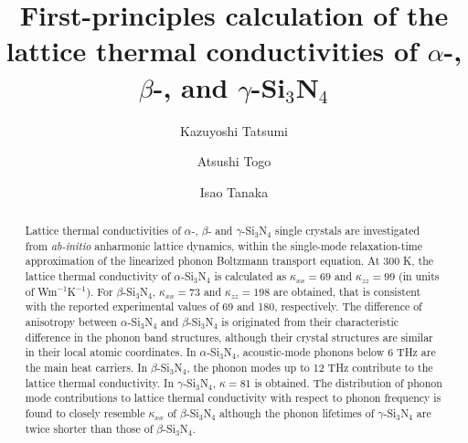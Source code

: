 \documentclass[twocolumn,amsmath,amssymb,a4paper,prb,superscriptaddress,floatfix]{revtex4-1}
\begin{document}
\title{First-principles calculation of the lattice thermal
conductivities of $\alpha$-, $\beta$-, and $\gamma$-Si$_3$N$_4$}

\author{Kazuyoshi Tatsumi} 

\author{Atsushi Togo}

\author{Isao Tanaka}

\begin{abstract}
Lattice thermal conductivities of $\alpha$-, $\beta$- and
$\gamma$-Si$_3$N$_4$ single crystals are investigated from {\it
ab-initio} anharmonic lattice dynamics, within the single-mode
relaxation-time approximation of the linearized phonon Boltzmann
transport equation. At 300 K, the lattice thermal conductivity of
$\alpha$-Si$_3$N$_4$ is calculated as $\kappa_{xx}=69$ and
$\kappa_{zz}=99$ (in units of Wm$^{-1}$K$^{-1}$). For
$\beta$-Si$_3$N$_4$, $\kappa_{xx}=73$ and $\kappa_{zz}=198$ are
obtained, that is consistent with the reported experimental values of 69
and 180, respectively. The difference of anisotropy between
$\alpha$-Si$_3$N$_4$ and $\beta$-Si$_3$N$_4$ is originated from their
characteristic difference in the phonon band structures, although their
crystal structures are similar in their local atomic coordinates. In
$\alpha$-Si$_3$N$_4$, acoustic-mode phonons below 6 THz are the main
heat carriers. In $\beta$-Si$_3$N$_4$, the phonon modes up to 12 THz
contribute to the lattice thermal conductivity.
%
In $\gamma$-Si$_3$N$_4$, $\kappa=81$ is obtained. The distribution of phonon
mode contributions to lattice thermal conductivity with respect to phonon
frequency is found to closely resemble $\kappa_{xx}$ of $\beta$-Si$_3$N$_4$
although the phonon lifetimes of $\gamma$-Si$_3$N$_4$ are twice shorter than
those of $\beta$-Si$_3$N$_4$.
\end{abstract}
\end{document}
